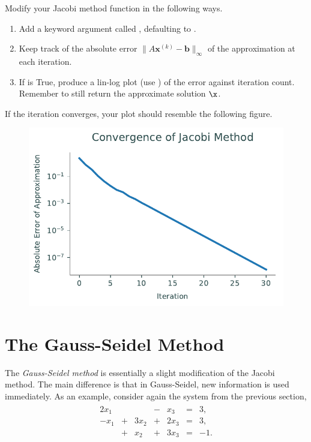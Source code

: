 \begin{problem}
Modify your Jacobi method function in the following ways.
\begin{enumerate}
    \item Add a keyword argument called , defaulting to .
    \item Keep track of the absolute error $\|A\mathbf{x}^{(k)} - \mathbf{b}\|_{\infty}$ of the approximation at each iteration.
    \item If  is {True}, produce a lin-log plot (use ) of the error against iteration count.
    Remember to still return the approximate solution $\x$.
\end{enumerate}
If the iteration converges, your plot should resemble the following figure.

\begin{figure}[H]
    \includegraphics[width=.7\textwidth]{figures/jacobi_convergence.pdf}
\end{figure}

\label{prob:plot-iterative-convergence}
\end{problem}

\section*{The Gauss-Seidel Method} %

The \emph{Gauss-Seidel method} is essentially a slight modification of the Jacobi method.
The main difference is that in Gauss-Seidel, new information is used immediately.
As an example, consider again the system from the previous section,
\begin{align*}
\begin{array}{ccccccr}
  2x_1 &   &      & - & x_3  & = & 3,  \\
  -x_1 & + & 3x_2 & + & 2x_3 & = & 3,  \\
       & + & x_2  & + & 3x_3 & = & -1. \\
\end{array}
\end{align*}

